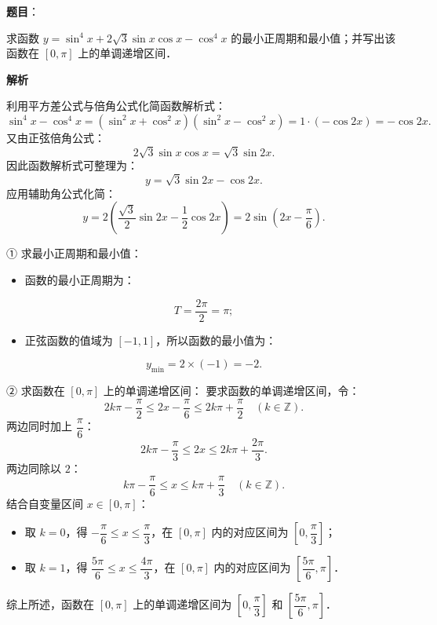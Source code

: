 \begin{answer}

\textbf{题目}：

求函数 $y = \sin^4 x + 2\sqrt{3} \sin x \cos x - \cos^4 x$ 的最小正周期和最小值；并写出该函数在 $[0, \pi]$ 上的单调递增区间．

\textbf{解析}

利用平方差公式与倍角公式化简函数解析式：
\nopagebreak[4]
\[
\sin^4 x - \cos^4 x = (\sin^2 x + \cos^2 x)(\sin^2 x - \cos^2 x) = 1 \cdot (-\cos 2x) = -\cos 2x.
\]
又由正弦倍角公式：
\nopagebreak[4]
\[
2\sqrt{3}\sin x \cos x = \sqrt{3}\sin 2x.
\]
因此函数解析式可整理为：
\nopagebreak[4]
\[
y = \sqrt{3}\sin 2x - \cos 2x.
\]
应用辅助角公式化简：
\nopagebreak[4]
\[
y = 2\left(\frac{\sqrt{3}}{2}\sin 2x - \frac{1}{2}\cos 2x\right) = 2\sin\left(2x - \frac{\pi}{6}\right).
\]

① 求最小正周期和最小值：
\begin{itemize}
\item 函数的最小正周期为：
\end{itemize}
\nopagebreak[4]
\[
T = \frac{2\pi}{2} = \pi;
\]
\begin{itemize}
\item 正弦函数的值域为 $[-1, 1]$，所以函数的最小值为：
\end{itemize}
\nopagebreak[4]
\[
y_{\min} = 2 \times (-1) = -2.
\]

② 求函数在 $[0, \pi]$ 上的单调递增区间：
要求函数的单调递增区间，令：
\nopagebreak[4]
\[
2k\pi - \frac{\pi}{2} \leqslant 2x - \frac{\pi}{6} \leqslant 2k\pi + \frac{\pi}{2} \quad (k \in \mathbb{Z}).
\]
两边同时加上 $\dfrac{\pi}{6}$：
\nopagebreak[4]
\[
2k\pi - \frac{\pi}{3} \leqslant 2x \leqslant 2k\pi + \frac{2\pi}{3}.
\]
两边同除以 $2$：
\nopagebreak[4]
\[
k\pi - \frac{\pi}{6} \leqslant x \leqslant k\pi + \frac{\pi}{3} \quad (k \in \mathbb{Z}).
\]
结合自变量区间 $x \in [0, \pi]$：
\begin{itemize}
\item 取 $k = 0$，得 $-\dfrac{\pi}{6} \leqslant x \leqslant \dfrac{\pi}{3}$，在 $[0, \pi]$ 内的对应区间为 $\left[0, \dfrac{\pi}{3}\right]$；
\item 取 $k = 1$，得 $\dfrac{5\pi}{6} \leqslant x \leqslant \dfrac{4\pi}{3}$，在 $[0, \pi]$ 内的对应区间为 $\left[\dfrac{5\pi}{6}, \pi\right]$．
\end{itemize}

综上所述，函数在 $[0, \pi]$ 上的单调递增区间为 $\left[0, \dfrac{\pi}{3}\right]$ 和 $\left[\dfrac{5\pi}{6}, \pi\right]$．


\end{answer}
